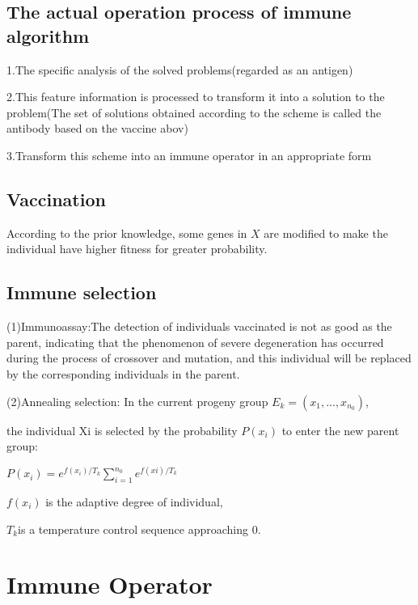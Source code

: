 \documentclass{article}
\begin{document}
\subsection{The actual operation process of immune algorithm}
\indent

 \par\setlength\parindent{1em}
 1.The specific analysis of the solved problems(regarded as an antigen)
 \par\setlength\parindent{1em}
 2.This feature information is processed to transform it into a solution to the problem(The set of solutions obtained according to the scheme is called the antibody based on the vaccine abov)
\par\setlength\parindent{1em}
 3.Transform this scheme into an immune operator in an appropriate form
 \subsection{Vaccination}
 According to the prior knowledge, some genes in $X$ are modified to make the individual have higher fitness for greater probability. 
 \subsection{Immune selection}
\indent

 \par\setlength\parindent{1em}
(1)Immunoassay:The detection of individuals vaccinated is not as good as the parent, indicating that the phenomenon of severe degeneration has occurred during the process of crossover and mutation, and this individual will be replaced by the corresponding individuals in the parent.
\par\setlength\parindent{1em}
(2)Annealing selection:
In the current progeny group $E_k=(x_1,...,x_{n_0})$, 

the individual Xi is selected by the probability $P(x_i)$ to enter the new parent group:
\par\setlength\parindent{6em}
$P(x_i)=e^{f(x_i)/T_k}\sum_{i=1}^{n_0}e^{f(xi)/T_k}$
\par\setlength\parindent{6em}
$f(x_i)$ is the adaptive degree of individual,
\par\setlength\parindent{6em}
$T_k$is a temperature control sequence approaching 0.



\section{Immune Operator}
\end{document}
